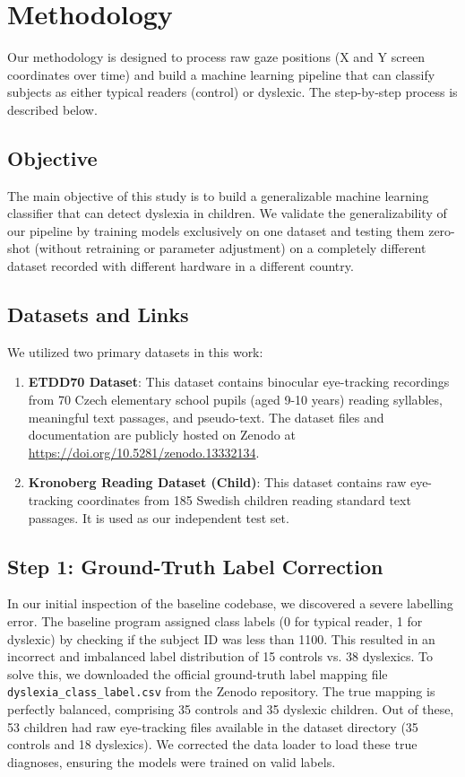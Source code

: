 \documentclass[journal]{IEEEtran}
\begin{document}
\section{Methodology}
Our methodology is designed to process raw gaze positions (X and Y screen coordinates over time) and build a machine learning pipeline that can classify subjects as either typical readers (control) or dyslexic. The step-by-step process is described below.

\subsection{Objective}
The main objective of this study is to build a generalizable machine learning classifier that can detect dyslexia in children. We validate the generalizability of our pipeline by training models exclusively on one dataset and testing them zero-shot (without retraining or parameter adjustment) on a completely different dataset recorded with different hardware in a different country.

\subsection{Datasets and Links}
We utilized two primary datasets in this work:
\begin{enumerate}
    \item \textbf{ETDD70 Dataset}: This dataset contains binocular eye-tracking recordings from 70 Czech elementary school pupils (aged 9-10 years) reading syllables, meaningful text passages, and pseudo-text. The dataset files and documentation are publicly hosted on Zenodo at \href{https://doi.org/10.5281/zenodo.13332134}{https://doi.org/10.5281/zenodo.13332134}.
    \item \textbf{Kronoberg Reading Dataset (Child)}: This dataset contains raw eye-tracking coordinates from 185 Swedish children reading standard text passages. It is used as our independent test set.
\end{enumerate}

\subsection{Step 1: Ground-Truth Label Correction}
In our initial inspection of the baseline codebase, we discovered a severe labelling error. The baseline program assigned class labels (0 for typical reader, 1 for dyslexic) by checking if the subject ID was less than 1100. This resulted in an incorrect and imbalanced label distribution of 15 controls vs. 38 dyslexics. 
To solve this, we downloaded the official ground-truth label mapping file \texttt{dyslexia\_class\_label.csv} from the Zenodo repository. The true mapping is perfectly balanced, comprising 35 controls and 35 dyslexic children. Out of these, 53 children had raw eye-tracking files available in the dataset directory (35 controls and 18 dyslexics). We corrected the data loader to load these true diagnoses, ensuring the models were trained on valid labels.
\end{document}
